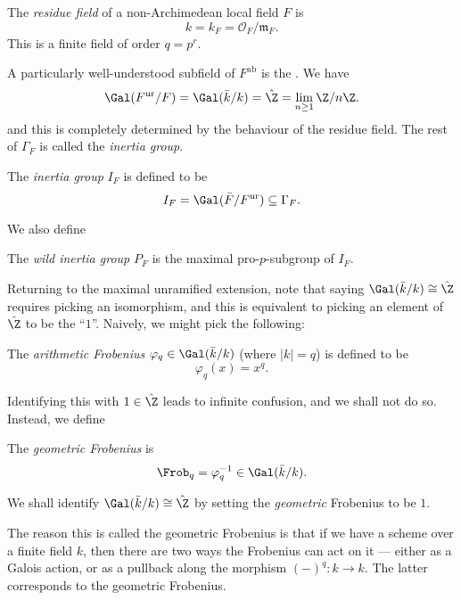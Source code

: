 \documentclass[a4paper]{article}
\newcommand\ab{\mathrm{ab}}
\newcommand\ur{\mathrm{ur}}
\begin{document}
\begin{defi}
  The \emph{residue field} of a non-Archimedean local field $F$ is
  \[
    k = k_F = \mathcal{O}_F/\mathfrak{m}_F.
  \]
  This is a finite field of order $q = p^r$.
\end{defi}

A particularly well-understood subfield of $F^{\ab}$ is the  \term{$F^{\ur}$}. We have
\[
  \Gal(F^{\ur}/F) = \Gal(\bar{k}/k) = \hat{\Z} = \lim_{n \geq 1} \Z/n\Z.
\]
and this is completely determined by the behaviour of the residue field. The rest of $\Gamma_F$ is called the \emph{inertia group}.
\begin{defi}
  The \emph{inertia group} $I_F$ is defined to be
  \[
    I_F = \Gal(\bar{F}/F^{\ur}) \subseteq \Gamma_F.
  \]
\end{defi}
We also define
\begin{defi}
  The \emph{wild inertia group} $P_F$ is the maximal pro-$p$-subgroup of $I_F$.
\end{defi}

Returning to the maximal unramified extension, note that saying $\Gal(\bar{k}/k) \cong \hat{\Z}$ requires picking an isomorphism, and this is equivalent to picking an element of $\hat{\Z}$ to be the ``$1$''. Naively, we might pick the following:
\begin{defi}
  The \emph{arithmetic Frobenius} $\varphi_q \in \Gal(\bar{k}/k)$ (where $|k| = q$) is defined to be
  \[
    \varphi_q(x) = x^q.
  \]
\end{defi}

Identifying this with $1 \in \hat{\Z}$ leads to infinite confusion, and we shall not do so. Instead, we define
\begin{defi}
  The \emph{geometric Frobenius} is
  \[
    \Frob_q = \varphi_q^{-1} \in \Gal(\bar{k}/k).
  \]
\end{defi}
We shall identify $\Gal(\bar{k}/k) \cong \hat{\Z}$ by setting the \emph{geometric} Frobenius to be $1$.

The reason this is called the geometric Frobenius is that if we have a scheme over a finite field $k$, then there are two ways the Frobenius can act on it --- either as a Galois action, or as a pullback along the morphism $(-)^q: k \to k$. The latter corresponds to the geometric Frobenius.
\end{document}
